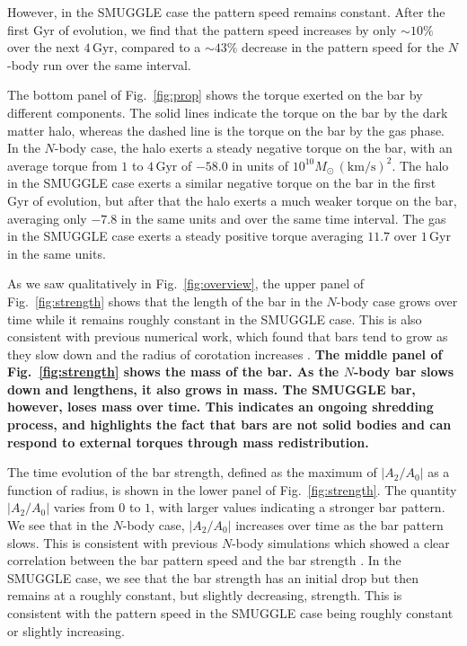 \documentclass[twocolumn,linenumbers,trackchanges]{aastex631}
\newcommand{\Nbody}{$N$-body}
\newcommand{\SMUGGLE}{SMUGGLE}
\begin{document}
However, in the \SMUGGLE{} case the pattern speed remains constant. After the first
Gyr of evolution, we find that the pattern speed increases by only $\sim10\%$
over the next $4\,\textrm{Gyr}$, compared to a $\sim43\%$ decrease in the
pattern speed for the \Nbody{} run over the same interval.

The bottom panel of Fig.~\ref{fig:prop} shows the torque exerted on the bar by
different components. The solid lines indicate the torque on the bar by the dark
matter halo, whereas the dashed line is the torque on the bar by the gas phase.
In the \Nbody{} case, the halo exerts a steady negative torque on the bar, with
an average torque from $1$ to $4\,\textrm{Gyr}$ of $-58.0$ in units of
$10^{10}M_{\odot}\,(\textrm{km}/\textrm{s})^2$. The halo in the \SMUGGLE{} case
exerts a similar negative torque on the bar in the first Gyr of evolution, but
after that the halo exerts a much weaker torque on the bar, averaging only
$-7.8$ in the same units and over the same time interval. The gas in the \SMUGGLE{}
case exerts a steady positive torque averaging $11.7$ over $1\,\textrm{Gyr}$ in
the same units.

As we saw qualitatively in Fig.~\ref{fig:overview}, the upper panel of
Fig.~\ref{fig:strength} shows that the length of the bar in the \Nbody{} case
grows over time while it remains roughly constant in the \SMUGGLE{} case. This
is also consistent with previous numerical work, which found that bars tend to
grow as they slow down and the radius of corotation increases
\citep{2000ApJ...543..704D, 2003MNRAS.341.1179A}. {\bf The middle panel of
Fig.~\ref{fig:strength} shows the mass of the bar. As the \Nbody{} bar slows
down and lengthens, it also grows in mass. The \SMUGGLE{} bar, however, loses
mass over time. This indicates an ongoing shredding process, and highlights the
fact that bars are not solid bodies and can respond to external torques through
mass redistribution.}

The time evolution of the bar strength, defined as the maximum of
$\left|A_2/A_0\right|$ as a function of radius, is shown in the lower panel of
Fig.~\ref{fig:strength}. The quantity $\left|A_2/A_0\right|$ varies from $0$ to
$1$, with larger values indicating a stronger bar pattern. We see that in the
\Nbody{} case, $\left|A_2/A_0\right|$ increases over time as the bar pattern
slows. This is consistent with previous \Nbody{} simulations which showed a
clear correlation between the bar pattern speed and the bar strength
\citep[e.g.,][]{2003MNRAS.341.1179A}. In the \SMUGGLE{} case, we see that the
bar strength has an initial drop but then remains at a roughly constant, but
slightly decreasing, strength. This is consistent with the pattern speed in the
\SMUGGLE{} case being roughly constant or slightly increasing.
\end{document}

